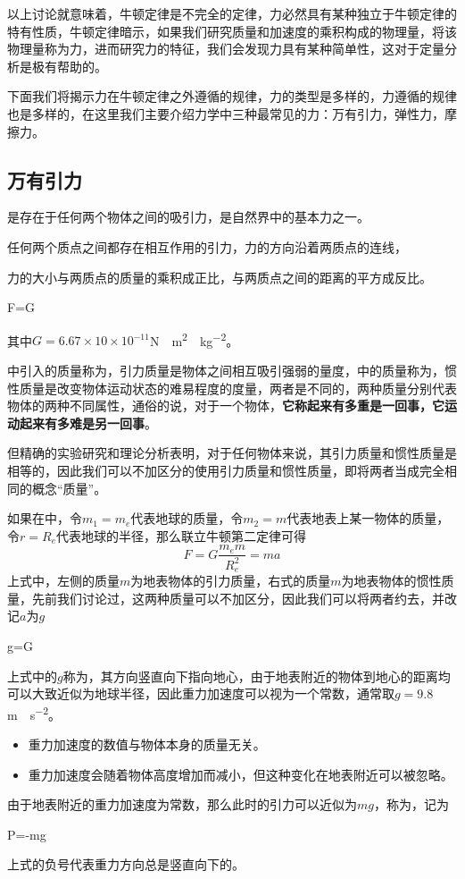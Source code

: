以上讨论就意味着，牛顿定律是不完全的定律，力必然具有某种独立于牛顿定律的特有性质，牛顿定律暗示，如果我们研究质量和加速度的乘积构成的物理量，将该物理量称为力，进而研究力的特征，我们会发现力具有某种简单性，这对于定量分析是极有帮助的。

下面我们将揭示力在牛顿定律之外遵循的规律，力的类型是多样的，力遵循的规律也是多样的，在这里我们主要介绍力学中三种最常见的力：万有引力，弹性力，摩擦力。

\subsection{万有引力}
是存在于任何两个物体之间的吸引力，是自然界中的基本力之一。

\begin{BoxPrinciple}[万有引力定律]
    任何两个质点之间都存在相互作用的引力，力的方向沿着两质点的连线，
    
    力的大小与两质点的质量的乘积成正比，与两质点之间的距离的平方成反比。
    \begin{BoxEq}
        F=G
    \end{BoxEq}
\end{BoxPrinciple}
其中$G=6.67\times 10\times 10^{-11}$\si{N\cdot m^2\cdot kg^{-2}}。

中引入的质量称为，引力质量是物体之间相互吸引强弱的量度，中的质量称为，惯性质量是改变物体运动状态的难易程度的度量，两者是不同的，两种质量分别代表物体的两种不同属性，通俗的说，对于一个物体，\textbf{它称起来有多重是一回事，它运动起来有多难是另一回事}。

但精确的实验研究和理论分析表明，对于任何物体来说，其引力质量和惯性质量是相等的，因此我们可以不加区分的使用引力质量和惯性质量，即将两者当成完全相同的概念“质量”。

如果在中，令$m_1=m_e$代表地球的质量，令$m_2=m$代表地表上某一物体的质量，令$r=R_e$代表地球的半径，那么联立牛顿第二定律可得
\begin{equation*}
    F=G\frac{m_em}{R_e^2}=ma
\end{equation*}
上式中，左侧的质量$m$为地表物体的引力质量，右式的质量$m$为地表物体的惯性质量，先前我们讨论过，这两种质量可以不加区分，因此我们可以将两者约去，并改记$a$为$g$
\begin{BoxEquation}[重力加速度]
    g=G
\end{BoxEquation}
上式中的$g$称为，其方向竖直向下指向地心，由于地表附近的物体到地心的距离均可以大致近似为地球半径，因此重力加速度可以视为一个常数，通常取$g=9.8$\si{m\cdot s^{-2}}。
\begin{itemize}
    \item 重力加速度的数值与物体本身的质量无关。
    \item 重力加速度会随着物体高度增加而减小，但这种变化在地表附近可以被忽略。
\end{itemize}
由于地表附近的重力加速度为常数，那么此时的引力可以近似为$mg$，称为，记为
\begin{BoxEquation}[重力公式]
    P=-mg
\end{BoxEquation}
上式的负号代表重力方向总是竖直向下的。


